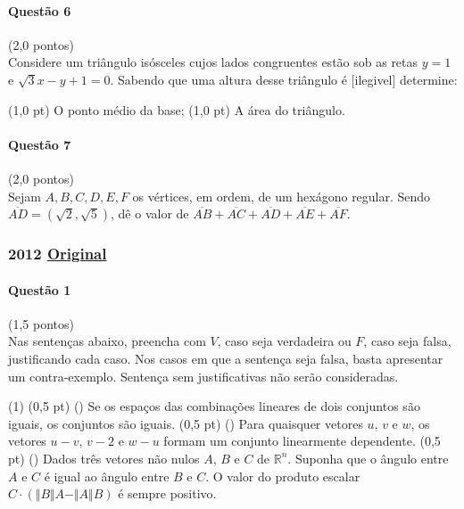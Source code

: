 \documentclass[12pt,a4paper]{article}
\newcommand{\R}{\mathbb{R}}
\newcommand{\norm}[1]{\Vert #1 \Vert}
\newcommand{\original}[1]{\tiny \href{#1}{Original} \normalsize}
\begin{document}
\paragraph{Questão 6} (2,0 pontos)\\
Considere um triângulo isósceles cujos lados congruentes estão sob as retas $y=1$ e $\sqrt{3}x - y + 1 = 0$. Sabendo que uma altura desse triângulo é [ilegivel] determine:

\begin{tasks}
\task (1,0 pt) O ponto médio da base;
\task (1,0 pt) A área do triângulo.
\end{tasks}

\paragraph{Questão 7} (2,0 pontos)\\
Sejam $A, B, C, D, E, F$ os vértices, em ordem, de um hexágono regular. Sendo $\overline{AD} = (\sqrt{2}, \sqrt{5})$, dê o valor de $\overline{AB}+ \overline{AC} + \overline{AD} + \overline{AE} + \overline{AF}$.

\newpage

\subsubsection{2012 \original{https://drive.google.com/file/d/1cPTDvUHajrI7FbYzNAGMJXli8peQZyDI/view?usp=sharing}}

\paragraph{Questão 1} (1,5 pontos)\\
Nas sentenças abaixo, preencha com $V$, caso seja verdadeira ou $F$, caso seja falsa, justificando cada caso. Nos casos em que a sentença seja falsa, basta apresentar um contra-exemplo. Sentença sem justificativas não serão consideradas.

\begin{tasks}(1)
\task (0,5 pt) (\quad) Se os espaços das combinações lineares de dois conjuntos são iguais, os conjuntos são iguais.
\task (0,5 pt) (\quad) Para quaisquer vetores $u,\,v$ e $w$, os vetores $u-v$, $v-2$ e $w-u$ formam um conjunto linearmente dependente.
\task (0,5 pt) (\quad) Dados três vetores não nulos $A$, $B$ e $C$ de $\R^n$. Suponha que o ângulo entre $A$ e $C$ é igual ao ângulo entre $B$ e $C$. O valor do produto escalar $C\cdot (\norm{B}A- \norm{A}B)$ é sempre positivo.
\end{tasks}
\end{document}
